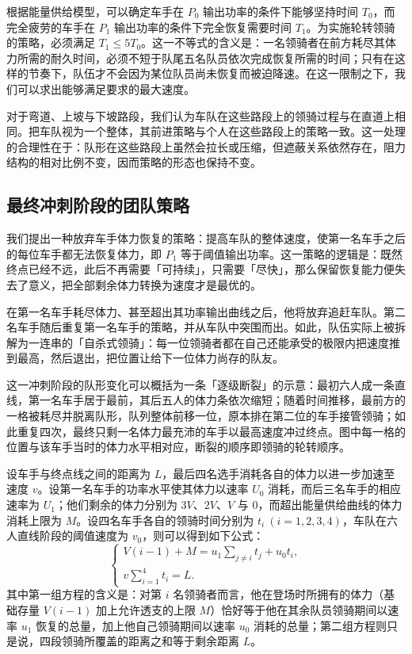 \documentclass[11pt,a4paper]{ctexart}
\begin{document}
根据能量供给模型，可以确定车手在 $P_0$ 输出功率的条件下能够坚持时间 $T_0$，而完全疲劳的车手在 $P_1$ 输出功率的条件下完全恢复需要时间 $T_1$。为实施轮转领骑的策略，必须满足 $T_1\leqslant 5T_0$。这一不等式的含义是：一名领骑者在前方耗尽其体力所需的耐久时间，必须不短于队尾五名队员依次完成恢复所需的时间；只有在这样的节奏下，队伍才不会因为某位队员尚未恢复而被迫降速。在这一限制之下，我们可以求出能够满足要求的最大速度。

对于弯道、上坡与下坡路段，我们认为车队在这些路段上的领骑过程与在直道上相同。把车队视为一个整体，其前进策略与个人在这些路段上的策略一致。这一处理的合理性在于：队形在这些路段上虽然会拉长或压缩，但遮蔽关系依然存在，阻力结构的相对比例不变，因而策略的形态也保持不变。

\subsection{最终冲刺阶段的团队策略}

我们提出一种放弃车手体力恢复的策略：提高车队的整体速度，使第一名车手之后的每位车手都无法恢复体力，即 $P_1$ 等于阈值输出功率。这一策略的逻辑是：既然终点已经不远，此后不再需要「可持续」，只需要「尽快」，那么保留恢复能力便失去了意义，把全部剩余体力转换为速度才是最优的。

在第一名车手耗尽体力、甚至超出其功率输出曲线之后，他将放弃追赶车队。第二名车手随后重复第一名车手的策略，并从车队中突围而出。如此，队伍实际上被拆解为一连串的「自杀式领骑」：每一位领骑者都在自己还能承受的极限内把速度推到最高，然后退出，把位置让给下一位体力尚存的队友。

这一冲刺阶段的队形变化可以概括为一条「逐级断裂」的示意：最初六人成一条直线，第一名车手居于最前，其后五人的体力条依次缩短；随着时间推移，最前方的一格被耗尽并脱离队形，队列整体前移一位，原本排在第二位的车手接管领骑；如此重复四次，最终只剩一名体力最充沛的车手以最高速度冲过终点。图中每一格的位置与该车手当时的体力水平相对应，断裂的顺序即领骑的轮转顺序。

设车手与终点线之间的距离为 $L$，最后四名选手消耗各自的体力以进一步加速至速度 $v$。设第一名车手的功率水平使其体力以速率 $U_0$ 消耗，而后三名车手的相应速率为 $U_1$；他们剩余的体力分别为 $3V$、$2V$、$V$ 与 $0$，而超出能量供给曲线的体力消耗上限为 $M$。设四名车手各自的领骑时间分别为 $t_i\ (i=1,2,3,4)$，车队在六人直线阶段的阈值速度为 $v_0$，则可以得到如下公式：
\begin{equation}
\begin{cases}
V(i-1)+M=u_1\displaystyle\sum_{j\neq i}t_j+u_0t_i,\\[1em]
v\displaystyle\sum_{i=1}^{4}t_i=L.
\end{cases}
\end{equation}
其中第一组方程的含义是：对第 $i$ 名领骑者而言，他在登场时所拥有的体力（基础存量 $V(i-1)$ 加上允许透支的上限 $M$）恰好等于他在其余队员领骑期间以速率 $u_1$ 恢复的总量，加上他自己领骑期间以速率 $u_0$ 消耗的总量；第二组方程则只是说，四段领骑所覆盖的距离之和等于剩余距离 $L$。
\end{document}
